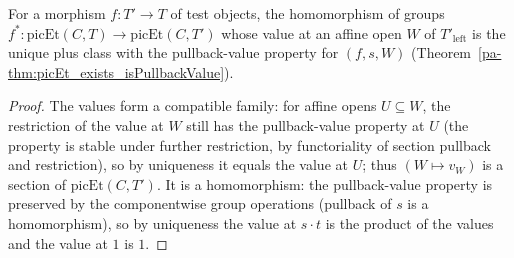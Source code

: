 \begin{definition}
  \label{pa-def:picEtMap}
  \leanok

  For a morphism \(f \colon T' \to T\) of test objects, the homomorphism of groups \(f^{*} \colon
  \mathrm{picEt}(C, T) \to \mathrm{picEt}(C, T')\) whose value at an affine open \(W\) of
  \(T'_{\mathrm{left}}\) is the unique plus class with the pullback-value property for \((f, s, W)\)
  (Theorem~\ref{pa-thm:picEt_exists_isPullbackValue}).
\end{definition}
\begin{proof}
  \leanok
  The values form a compatible family: for affine opens \(U \subseteq W\), the restriction of the
  value at \(W\) still has the pullback-value property at \(U\) (the property is stable under
  further restriction, by functoriality of section pullback and restriction), so by uniqueness it
  equals the value at \(U\); thus \((W \mapsto v_W)\) is a section of \(\mathrm{picEt}(C, T')\). It
  is a homomorphism: the pullback-value property is preserved by the componentwise group operations
  (pullback of \(s\) is a homomorphism), so by uniqueness the value at \(s \cdot t\) is the product
  of the values and the value at \(1\) is \(1\).
\end{proof}

